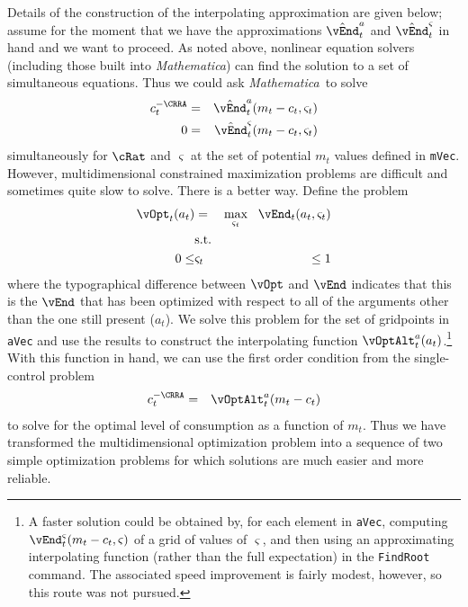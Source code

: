 \documentclass[titlepage]{\econtex}
\newcommand{\Mma}{\textit{Mathematica}}
\begin{document}
Details of the construction of the interpolating approximation are
given below; assume for the moment that we have the approximations
$\hat{\vEnd}_{t}^{{a}}$ and $\hat{\vEnd}_{t}^{\varsigma}$ in
hand and we want to proceed.  As noted above, nonlinear equation
solvers (including those built into {\Mma}) can find the
solution to a set of simultaneous equations.  Thus we could ask
{\Mma}~to solve
\begin{eqnarray}
        {c}_{t}^{-\CRRA} & = & \hat{\vEnd}^{a}_{t}({m}_{t}-{c}_{t},\varsigma_{t}) \label{eq:FOCwrtcMultContr}
\\      0 & = & \hat{\vEnd}^{\varsigma}_{t}({m}_{t}-{c}_{t},\varsigma_{t}) \label{eq:FOCwrtw}
\end{eqnarray}
simultaneously for $\cRat$ and $\varsigma$ at the set of potential ${m}_{t}$ values defined in
\texttt{mVec}. However, multidimensional constrained
maximization problems are difficult and sometimes quite slow to
solve.  There is a better way.  Define the problem
\begin{eqnarray}
        \vOpt_{t}({a}_{t}) & = & \max_{\varsigma_{t}} ~~  \vEnd_{t}({a}_{t},\varsigma_{t})
\\      & \text{s.t.} & \nonumber
\\      0 \leq & \varsigma_{t} & \leq 1
\end{eqnarray}
where the typographical difference between $\vOpt$ and $\vEnd$
indicates that this is the $\vEnd$ that has been optimized with
respect to all of the arguments other than the one still present
(${a}_{t}$).  We solve this problem for the set of gridpoints in
\texttt{aVec} and use the results to construct the interpolating
function $\vOptAlt_{t}^{a}({a}_{t})$.\footnote{A faster solution
  could be obtained by, for each element in \texttt{aVec}, computing
  $\vEnd^{\varsigma}_{t}({m}_{t}-{c}_{t},\varsigma)$ of a grid of
  values of $\varsigma$, and then using an approximating interpolating
  function (rather than the full expectation) in the \texttt{FindRoot}
  command.  The associated speed improvement is fairly modest,
  however, so this route was not pursued.}  With this function in
hand, we can use the first order condition from the single-control
problem
\begin{eqnarray*}
        {c}_{t}^{-\CRRA} & = & \vOptAlt_{t}^{{a}}({m}_{t}-{c}_{t})
\end{eqnarray*}
to solve for the optimal level of consumption as a function of
${m}_{t}$.  Thus we have transformed the multidimensional optimization
problem into a sequence of two simple optimization problems for which
solutions are much easier and more reliable.
\end{document}
